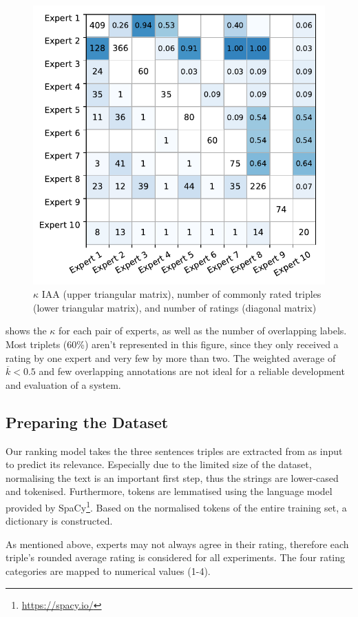 \begin{figure}
	\includegraphics[width=0.7\linewidth]{iaa}
	\caption{$\kappa$ IAA (upper triangular matrix), number of commonly rated triples (lower triangular matrix), and number of ratings (diagonal matrix)}
	\label{fig:iaa}
\end{figure}

 shows the $\kappa$ for each pair of experts, as well as the number of overlapping labels. Most triplets (60\%) aren't represented in this figure, since they only received a rating by one expert and very few by more than two. The weighted average of $\overline{k}<0.5$ and few overlapping annotations are not ideal for a reliable development and evaluation of a system.

\subsection{Preparing the Dataset}
Our ranking model takes the three sentences triples are extracted from as input to predict its relevance. Especially due to the limited size of the dataset, normalising the text is an important first step, thus the strings are lower-cased and tokenised. Furthermore, tokens are lemmatised using the language model provided by SpaCy\footnote{\url{https://spacy.io/}}. Based on the normalised tokens of the entire training set, a dictionary is constructed.

As mentioned above, experts may not always agree in their rating, therefore each triple's rounded average rating is considered for all experiments. The four rating categories are mapped to numerical values (1-4).

